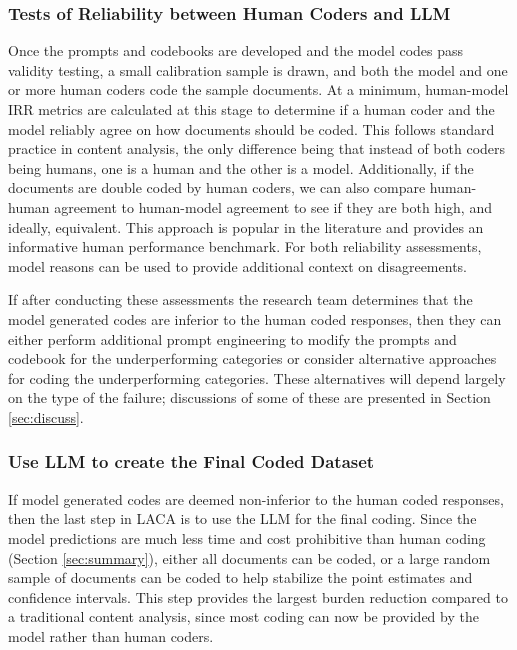 \documentclass{article}
\begin{document}
\subsubsection{Tests of Reliability between Human Coders and LLM}
Once the prompts and codebooks are developed and the model codes pass validity testing, a small calibration sample is drawn, and both the model and one or more human coders code the sample documents. At a minimum, human-model IRR metrics are calculated at this stage to determine if a human coder and the model reliably agree on how documents should be coded.  This follows standard practice in content analysis, the only difference being that instead of both coders being humans, one is a human and the other is a model.  Additionally, if the documents are double coded by human coders, we can also compare human-human agreement to human-model agreement to see if they are both high, and ideally, equivalent. This approach is popular in the literature \cite{gilardi_chatgpt_2023, tornberg_chatgpt-4_2023, xiao_supporting_2023} and provides an informative human performance benchmark.  For both reliability assessments, model reasons can be used to provide additional context on disagreements.

If after conducting these assessments the research team determines that the model generated codes are inferior to the human coded responses, then they can either perform additional prompt engineering to modify the prompts and codebook for the underperforming categories or consider alternative approaches for coding the underperforming categories.  These alternatives will depend largely on the type of the failure; discussions of some of these are presented in Section \ref{sec:discuss}.  

\subsubsection{Use LLM to create the Final Coded Dataset}
If model generated codes are deemed non-inferior to the human coded responses, then the last step in LACA is to use the LLM for the final coding.  Since the model predictions are much less time and cost prohibitive than human coding (Section \ref{sec:summary}), either all documents can be coded, or a large random sample of documents can be coded to help stabilize the point estimates and confidence intervals.  This step provides the largest burden reduction compared to a traditional content analysis, since most coding can now be provided by the model rather than human coders.
\end{document}

